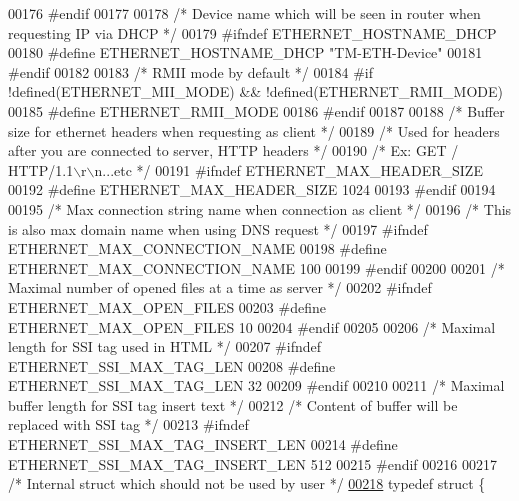 \begin{DoxyCode}
00176 \textcolor{preprocessor}{#endif}
00177 
00178 \textcolor{comment}{/* Device name which will be seen in router when requesting IP via DHCP */}
00179 \textcolor{preprocessor}{#ifndef ETHERNET\_HOSTNAME\_DHCP}
00180 \textcolor{preprocessor}{#define ETHERNET\_HOSTNAME\_DHCP              "TM-ETH-Device"}
00181 \textcolor{preprocessor}{#endif}
00182 
00183 \textcolor{comment}{/* RMII mode by default */}
00184 \textcolor{preprocessor}{#if !defined(ETHERNET\_MII\_MODE) && !defined(ETHERNET\_RMII\_MODE)}
00185 \textcolor{preprocessor}{    #define ETHERNET\_RMII\_MODE}
00186 \textcolor{preprocessor}{#endif}
00187 
00188 \textcolor{comment}{/* Buffer size for ethernet headers when requesting as client */}
00189 \textcolor{comment}{/* Used for headers after you are connected to server, HTTP headers */}
00190 \textcolor{comment}{/* Ex: GET / HTTP/1.1\(\backslash\)r\(\backslash\)n...etc */}
00191 \textcolor{preprocessor}{#ifndef ETHERNET\_MAX\_HEADER\_SIZE}
00192 \textcolor{preprocessor}{#define ETHERNET\_MAX\_HEADER\_SIZE            1024}
00193 \textcolor{preprocessor}{#endif}
00194 
00195 \textcolor{comment}{/* Max connection string name when connection as client */}
00196 \textcolor{comment}{/* This is also max domain name when using DNS request */}
00197 \textcolor{preprocessor}{#ifndef ETHERNET\_MAX\_CONNECTION\_NAME}
00198 \textcolor{preprocessor}{#define ETHERNET\_MAX\_CONNECTION\_NAME        100}
00199 \textcolor{preprocessor}{#endif}
00200 
00201 \textcolor{comment}{/* Maximal number of opened files at a time as server */}
00202 \textcolor{preprocessor}{#ifndef ETHERNET\_MAX\_OPEN\_FILES}
00203 \textcolor{preprocessor}{#define ETHERNET\_MAX\_OPEN\_FILES             10}
00204 \textcolor{preprocessor}{#endif}
00205 
00206 \textcolor{comment}{/* Maximal length for SSI tag used in HTML */}
00207 \textcolor{preprocessor}{#ifndef ETHERNET\_SSI\_MAX\_TAG\_LEN}
00208 \textcolor{preprocessor}{#define ETHERNET\_SSI\_MAX\_TAG\_LEN            32}
00209 \textcolor{preprocessor}{#endif}
00210 
00211 \textcolor{comment}{/* Maximal buffer length for SSI tag insert text */}
00212 \textcolor{comment}{/* Content of buffer will be replaced with SSI tag */}
00213 \textcolor{preprocessor}{#ifndef ETHERNET\_SSI\_MAX\_TAG\_INSERT\_LEN}
00214 \textcolor{preprocessor}{#define ETHERNET\_SSI\_MAX\_TAG\_INSERT\_LEN     512}
00215 \textcolor{preprocessor}{#endif}
00216 
00217 \textcolor{comment}{/* Internal struct which should not be used by user */}
\hypertarget{tm__stm32f4__ethernet_8h_source_l00218}{}\hyperlink{struct_t_m___e_t_h_e_r_n_e_t__t}{00218} \textcolor{keyword}{typedef} \textcolor{keyword}{struct }\{

\end{DoxyCode}
